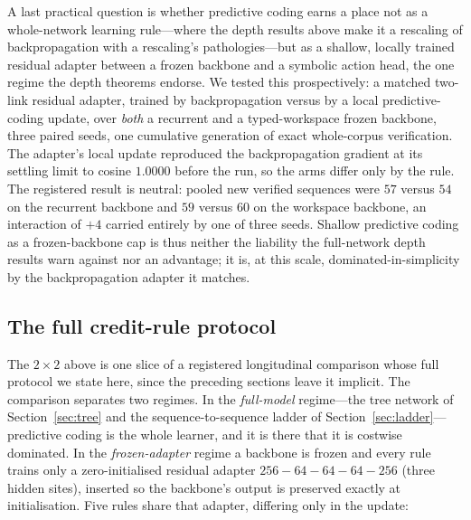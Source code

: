 \documentclass[11pt]{article}
\begin{document}
A last practical question is whether predictive coding earns a place not as a whole-network
learning rule---where the depth results above make it a rescaling of backpropagation with a
rescaling's pathologies---but as a shallow, locally trained residual adapter between a
frozen backbone and a symbolic action head, the one regime the depth theorems endorse. We
tested this prospectively: a matched two-link residual adapter, trained by backpropagation
versus by a local predictive-coding update, over \emph{both} a recurrent and a typed-workspace
frozen backbone, three paired seeds, one cumulative generation of exact whole-corpus
verification. The adapter's local update reproduced the backpropagation gradient at its
settling limit to cosine $1.0000$ before the run, so the arms differ only by the rule. The
registered result is neutral: pooled new verified sequences were $57$ versus $54$ on the
recurrent backbone and $59$ versus $60$ on the workspace backbone, an interaction of $+4$
carried entirely by one of three seeds. Shallow predictive coding as a frozen-backbone cap
is thus neither the liability the full-network depth results warn against nor an advantage;
it is, at this scale, dominated-in-simplicity by the backpropagation adapter it matches.

\subsection{The full credit-rule protocol}
\label{sec:credit-protocol}

The $2\times2$ above is one slice of a registered longitudinal comparison whose full protocol
we state here, since the preceding sections leave it implicit. The comparison separates two
regimes. In the \emph{full-model} regime---the tree network of
Section~\ref{sec:tree} and the sequence-to-sequence ladder of
Section~\ref{sec:ladder}---predictive coding is the whole learner, and it is there that it is
costwise dominated. In the \emph{frozen-adapter} regime a backbone is frozen and every rule
trains only a zero-initialised residual adapter $256\!-\!64\!-\!64\!-\!64\!-\!256$ (three
hidden sites), inserted so the backbone's output is preserved exactly at initialisation. Five
rules share that adapter, differing only in the update:
\end{document}

